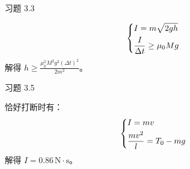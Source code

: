 \begin{problem}
    习题 3.3
    \begin{solution}
        $$
        \begin{dcases}
            I = m \sqrt{2gh} \\
            \frac{I}{\Delta t} \ge \mu_0 M g
        \end{dcases}
        $$
        解得 $h \ge \frac{\mu_0^2 M^2 g^2 (\Delta t)^2}{2 m^2}$。
    \end{solution}
\end{problem}

\begin{problem}
    习题 3.5
    \begin{solution}
        恰好打断时有：
        $$
        \begin{dcases}
            I = m v \\
            \frac{m v^2}{l} = T_0 - m g
        \end{dcases}
        $$
        解得 $I = 0.86 \,\mathrm{N \cdot s}$。
    \end{solution}
\end{problem}
